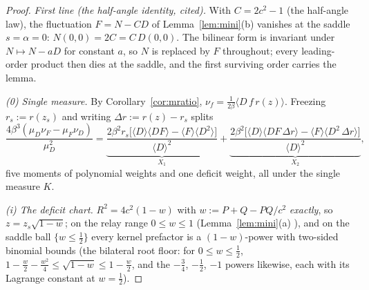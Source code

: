 \documentclass[11pt]{article}
\theoremstyle{remark}
\begin{document}
\begin{proof}
\emph{First line (the half-angle identity, cited).} With
$C=2c^2-1$ (the half-angle law), the fluctuation $F=N-CD$ of
Lemma~\ref{lem:mini}\textup{(b)} vanishes at the saddle
$s=\alpha=0$: $N(0,0)=2C=C\,D(0,0)$. The bilinear form is invariant
under $N\mapsto N-aD$ for constant $a$, so $N$ is replaced by $F$
throughout; every leading-order product then dies at the saddle,
and the first surviving order carries the lemma.

\emph{(0) Single measure.} By Corollary~\ref{cor:mratio},
$\nu_f=\frac1{2\beta}\langle D\,f\,r(z)\rangle$. Freezing
$r_s:=r(z_s)$ and writing $\Delta r:=r(z)-r_s$ splits
\[
\frac{4\beta^3(\mu_D\nu_F-\mu_F\nu_D)}{\mu_D^2}
=\underbrace{\frac{2\beta^2 r_s\bigl[\langle D\rangle\langle
DF\rangle-\langle F\rangle\langle D^2\rangle\bigr]}
{\langle D\rangle^2}}_{\textstyle X_1}
+\underbrace{\frac{2\beta^2\bigl[\langle D\rangle\langle
DF\,\Delta r\rangle-\langle F\rangle\langle D^2\,\Delta r\rangle
\bigr]}{\langle D\rangle^2}}_{\textstyle X_2},
\]
five moments of polynomial weights and one deficit weight, all
under the single measure $K$.

\emph{(i) The deficit chart.} $R^2=4c^2(1-w)$ with
$w:=P+Q-PQ/c^2$ \emph{exactly}, so $z=z_s\sqrt{1-w}$; on the relay
range $0\le w\le1$ \textup{(}Lemma~\ref{lem:mini}\textup{(a)}%
\textup{)}, and on the saddle ball $\{w\le\tfrac12\}$ every kernel
prefactor is a $(1-w)$-power with two-sided binomial bounds
\textup{(}the bilateral root floor: for $0\le w\le\tfrac12$,
$1-\tfrac w2-\tfrac{w^2}4\le\sqrt{1-w}\le1-\tfrac w2$, and the
$-\tfrac34$, $-\tfrac12$, $-1$ powers likewise, each with its
Lagrange constant at $w=\tfrac12$\textup{)}.


\end{proof}
\end{document}
